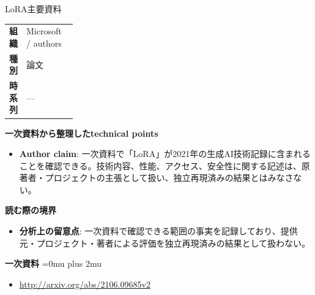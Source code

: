 \begin{technicalnote}{LoRA}{主要資料}
\begingroup
\begin{tabularx}{\linewidth}{@{}>{\bfseries}p{0.22\linewidth}X@{}}
組織 & Microsoft / authors \\
種別 & 論文 \\
時系列 & — \\
\end{tabularx}
\smallskip
{\bfseries 一次資料から整理したtechnical points}
\begin{itemize}[leftmargin=1.5em,itemsep=0.35em]
\item \textbf{Author claim}: 一次資料で「LoRA」が2021年の生成AI技術記録に含まれることを確認できる。技術内容、性能、アクセス、安全性に関する記述は、原著者・プロジェクトの主張として扱い、独立再現済みの結果とはみなさない。
\end{itemize}
\begin{minipage}{\linewidth}
{\bfseries 読む際の境界}
\begin{itemize}[leftmargin=1.5em,itemsep=0.35em]
\item \textbf{分析上の留意点}: 一次資料で確認できる範囲の事実を記録しており、提供元・プロジェクト・著者による評価を独立再現済みの結果として扱わない。
\end{itemize}
\begin{samepage}
{\bfseries 一次資料}
\begingroup\sloppy
\Urlmuskip=0mu plus 2mu\relax
\begin{itemize}[leftmargin=1.5em,itemsep=0.25em]
\item {\scriptsize\url{http://arxiv.org/abs/2106.09685v2}}
\end{itemize}
\endgroup
\end{samepage}
\end{minipage}
\endgroup
\end{technicalnote}
\medskip
